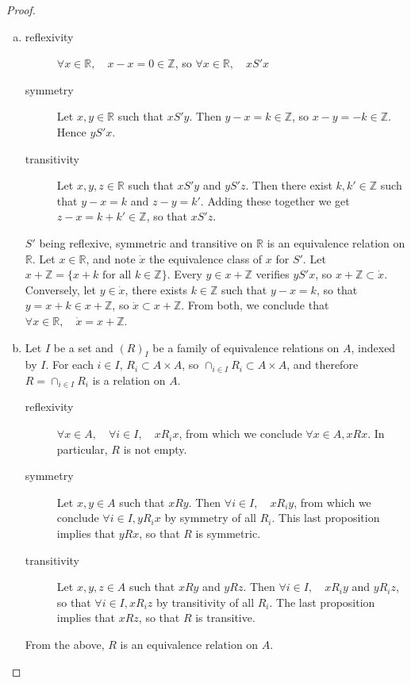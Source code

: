 \documentclass[11pt,a4paper,twoside]{article}
\theoremstyle{definition}
\begin{document}
\begin{proof}\hfill

  \begin{enumerate}[(a)]

  \item
    \begin{description}
    \item [reflexivity] $\forall x \in \mathbb{R}, \quad x - x = 0 \in \mathbb{Z}$, so $\forall x \in \mathbb{R}, \quad x S'x$
    \item [symmetry] Let $x, y \in \mathbb{R}$ such that $x S' y$. Then $y - x = k \in \mathbb{Z}$, so $x - y = -k \in \mathbb{Z}$. Hence $y S' x$.
    \item [transitivity] Let $x, y, z \in \mathbb{R}$ such that $x S' y$ and $y S' z$. Then there exist $k, k' \in \mathbb{Z}$ such that $y - x = k$ and $z - y = k'$.
      Adding these together we get $z - x = k + k' \in \mathbb{Z}$, so that $x S' z$.
    \end{description}
    $S'$ being reflexive, symmetric and transitive on $\mathbb{R}$ is an equivalence relation on $\mathbb{R}$. Let $x \in \mathbb{R}$, and note $\dot{x}$ the equivalence class of $x$ for $S'$.
    Let $x + \mathbb{Z} = \big\{ x + k \text{ for all } k \in \mathbb{Z} \big\}$. Every $y \in x + \mathbb{Z}$ verifies $y S' x$, so $x + \mathbb{Z} \subset \dot{x}$.
      Conversely, let $y \in \dot{x}$, there exists $k \in \mathbb{Z}$ such that $y - x = k$, so that $y = x + k \in x + \mathbb{Z}$, so $\dot{x} \subset x + \mathbb{Z}$.
      From both, we conclude that $\forall x \in \mathbb{R}, \quad \dot{x} = x + \mathbb{Z}$.

    \item Let $I$ be a set and $(R)_I$ be a family of equivalence relations on $A$, indexed by $I$. For each $i \in I$, $R_i \subset A \times A$, so $\cap_{i \in I} R_i \subset A \times A$, and
      therefore $R = \cap_{i \in I} R_i$ is a relation on $A$.
      \begin{description}
      \item [reflexivity] $\forall x \in A, \quad \forall i \in I, \quad x R_i x$, from which we conclude $\forall x \in A, x R x$. In particular, $R$ is not empty.
      \item [symmetry] Let $x, y \in A$ such that $x R y$. Then $\forall i \in I, \quad x R_i y$, from which we conclude $\forall i \in I, y R_i x$ by symmetry of all $R_i$.
        This last proposition implies that $y R x$, so that $R$ is symmetric.
      \item [transitivity] Let $x, y, z \in A$ such that $x R y$ and $y R z$. Then $\forall i \in I, \quad x R_i y$ and $y R_i z$, so that $\forall i \in I, x R_i z$ by transitivity of all $R_i$.
        The last proposition implies that $x R z$, so that $R$ is transitive.
      \end{description}
      From the above, $R$ is an equivalence relation on $A$.


\end{enumerate}
\end{proof}
\end{document}
